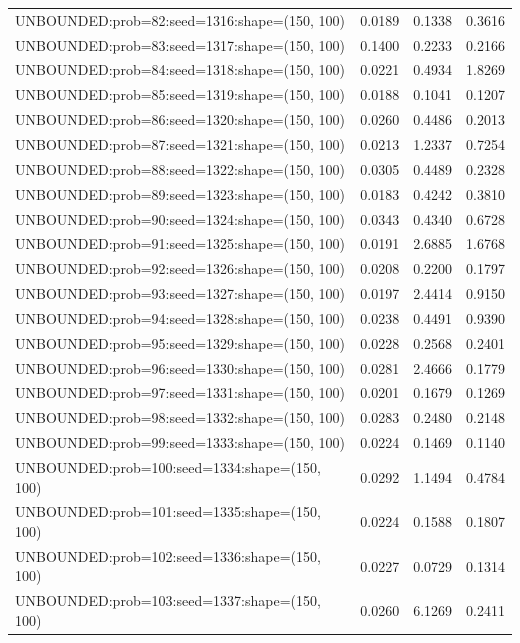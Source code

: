 \begin{longtable}{lccc}
UNBOUNDED:prob=82:seed=1316:shape=(150, 100)  &   0.0189 &  0.1338 &  0.3616 \\
UNBOUNDED:prob=83:seed=1317:shape=(150, 100)  &   0.1400 &  0.2233 &  0.2166 \\
UNBOUNDED:prob=84:seed=1318:shape=(150, 100)  &   0.0221 &  0.4934 &  1.8269 \\
UNBOUNDED:prob=85:seed=1319:shape=(150, 100)  &   0.0188 &  0.1041 &  0.1207 \\
UNBOUNDED:prob=86:seed=1320:shape=(150, 100)  &   0.0260 &  0.4486 &  0.2013 \\
UNBOUNDED:prob=87:seed=1321:shape=(150, 100)  &   0.0213 &  1.2337 &  0.7254 \\
UNBOUNDED:prob=88:seed=1322:shape=(150, 100)  &   0.0305 &  0.4489 &  0.2328 \\
UNBOUNDED:prob=89:seed=1323:shape=(150, 100)  &   0.0183 &  0.4242 &  0.3810 \\
UNBOUNDED:prob=90:seed=1324:shape=(150, 100)  &   0.0343 &  0.4340 &  0.6728 \\
UNBOUNDED:prob=91:seed=1325:shape=(150, 100)  &   0.0191 &  2.6885 &  1.6768 \\
UNBOUNDED:prob=92:seed=1326:shape=(150, 100)  &   0.0208 &  0.2200 &  0.1797 \\
UNBOUNDED:prob=93:seed=1327:shape=(150, 100)  &   0.0197 &  2.4414 &  0.9150 \\
UNBOUNDED:prob=94:seed=1328:shape=(150, 100)  &   0.0238 &  0.4491 &  0.9390 \\
UNBOUNDED:prob=95:seed=1329:shape=(150, 100)  &   0.0228 &  0.2568 &  0.2401 \\
UNBOUNDED:prob=96:seed=1330:shape=(150, 100)  &   0.0281 &  2.4666 &  0.1779 \\
UNBOUNDED:prob=97:seed=1331:shape=(150, 100)  &   0.0201 &  0.1679 &  0.1269 \\
UNBOUNDED:prob=98:seed=1332:shape=(150, 100)  &   0.0283 &  0.2480 &  0.2148 \\
UNBOUNDED:prob=99:seed=1333:shape=(150, 100)  &   0.0224 &  0.1469 &  0.1140 \\
UNBOUNDED:prob=100:seed=1334:shape=(150, 100) &   0.0292 &  1.1494 &  0.4784 \\
UNBOUNDED:prob=101:seed=1335:shape=(150, 100) &   0.0224 &  0.1588 &  0.1807 \\
UNBOUNDED:prob=102:seed=1336:shape=(150, 100) &   0.0227 &  0.0729 &  0.1314 \\
UNBOUNDED:prob=103:seed=1337:shape=(150, 100) &   0.0260 &  6.1269 &  0.2411 \\

\end{longtable}
